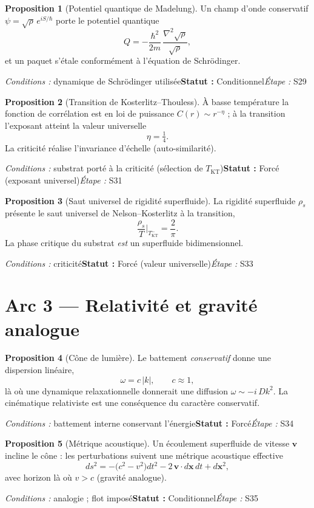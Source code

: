 \documentclass[11pt,a4paper]{article}
\theoremstyle{definition}
\newtheorem{prop}{Proposition}
\newcommand{\statut}[3]{\par\smallskip\noindent\textit{Conditions :} #1\quad\textbf{Statut :} #2\quad\textit{Étape :} #3\par\medskip}
\begin{document}
\begin{prop}[Potentiel quantique de Madelung]
Un champ d'onde conservatif $\psi=\sqrt{\rho}\,e^{iS/\hbar}$ porte le potentiel quantique
\[ Q=-\frac{\hbar^2}{2m}\,\frac{\nabla^2\sqrt{\rho}}{\sqrt{\rho}}, \]
et un paquet s'étale conformément à l'équation de Schrödinger.
\end{prop}
\statut{dynamique de Schrödinger utilisée}{Conditionnel}{S29}

\begin{prop}[Transition de Kosterlitz--Thouless]
À basse température la fonction de corrélation est en loi de puissance $C(r)\sim r^{-\eta}$ ; à la transition l'exposant atteint la valeur universelle
\[ \eta = \tfrac{1}{4}. \]
La criticité réalise l'invariance d'échelle (auto-similarité).
\end{prop}
\statut{substrat porté à la criticité (sélection de $T_{\mathrm{KT}}$)}{Forcé (exposant universel)}{S31}

\begin{prop}[Saut universel de rigidité superfluide]
La rigidité superfluide $\rho_s$ présente le saut universel de Nelson--Kosterlitz à la transition,
\[ \frac{\rho_s}{T}\Big|_{T_{\mathrm{KT}}^-}=\frac{2}{\pi}. \]
La phase critique du substrat \emph{est} un superfluide bidimensionnel.
\end{prop}
\statut{criticité}{Forcé (valeur universelle)}{S33}

\section*{Arc 3 — Relativité et gravité analogue}

\begin{prop}[Cône de lumière]
Le battement \emph{conservatif} donne une dispersion linéaire,
\[ \omega = c\,|k|,\qquad c\approx 1, \]
là où une dynamique relaxationnelle donnerait une diffusion $\omega\sim -i\,Dk^2$. La cinématique relativiste est une conséquence du caractère conservatif.
\end{prop}
\statut{battement interne conservant l'énergie}{Forcé}{S34}

\begin{prop}[Métrique acoustique]
Un écoulement superfluide de vitesse $\mathbf v$ incline le cône : les perturbations suivent une métrique acoustique effective
\[ ds^2=-\big(c^2-v^2\big)dt^2-2\,\mathbf v\!\cdot\! d\mathbf x\,dt+d\mathbf x^2, \]
avec horizon là où $v>c$ (gravité analogue).
\end{prop}
\statut{analogie ; flot imposé}{Conditionnel}{S35}
\end{document}
